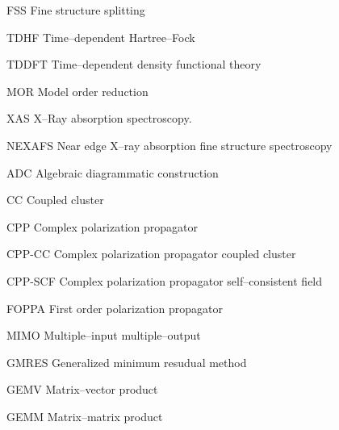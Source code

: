 \begin{glossary}
  \item[FSS]         Fine structure splitting
  \item[TDHF]        Time--dependent Hartree--Fock
  \item[TDDFT]       Time--dependent density functional theory
  \item[MOR]         Model order reduction
  \item[XAS]         X--Ray absorption spectroscopy.
  \item[NEXAFS]      Near edge X--ray absorption fine structure spectroscopy
  \item[ADC]         Algebraic diagrammatic construction
  \item[CC]          Coupled cluster
  \item[CPP]         Complex polarization propagator
  \item[CPP-CC]      Complex polarization propagator coupled cluster
  \item[CPP-SCF]     Complex polarization propagator self--consistent field
  \item[FOPPA]       First order polarization propagator
  \item[MIMO]        Multiple--input multiple--output
  \item[GMRES]       Generalized minimum resudual method
  \item[GEMV]        Matrix--vector product
  \item[GEMM]        Matrix--matrix product
\end{glossary}




